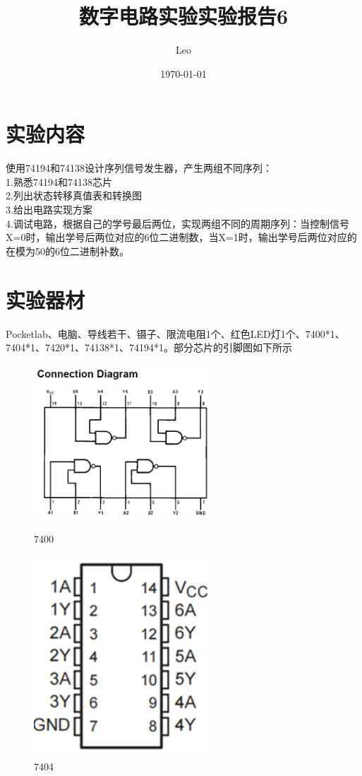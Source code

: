 \documentclass{ctexart}
\title{数字电路实验\quad 实验报告6}
\author{Leo}
\date{\today}
\begin{document}
\maketitle
\section{实验内容}
使用74194和74138设计序列信号发生器，产生两组不同序列：\\
1.熟悉74194和74138芯片\\
2.列出状态转移真值表和转换图\\ 
3.给出电路实现方案\\
4.调试电路，根据自己的学号最后两位，实现两组不同的周期序列：当控制信号X=0时，输出学号后两位对应的6位二进制数，当X=1时，输出学号后两位对应的在模为50的6位二进制补数。
\section{实验器材}
Pocketlab、电脑、导线若干、镊子、限流电阻1个、红色LED灯1个、7400*1、7404*1、7420*1、74138*1、74194*1。部分芯片的引脚图如下所示
\begin{figure}[H]
    \centering
    \begin{minipage}{0.5\textwidth}
    \centering
           \includegraphics[width=0.6\textwidth]{7400.png}
           \caption{7400}
    \label{}
    \end{minipage}
    \hspace{0.05\textwidth}
    \begin{minipage}{0.3\textwidth}
    \centering
           \includegraphics[width=0.6\textwidth]{7404.png}
           \caption{7404}
    \label{7474}
    \end{minipage}
\end{figure}
\end{document}
